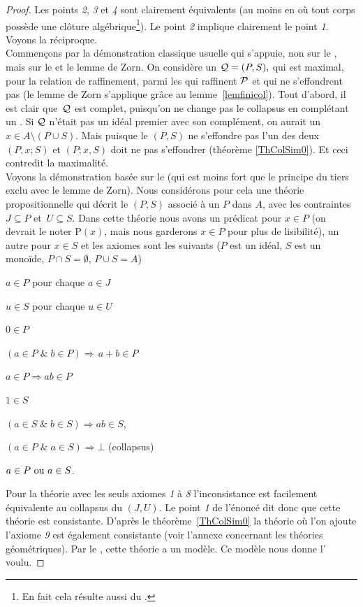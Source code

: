 \begin{proof} 
Les points \emph{2}, \emph{3} et \emph{4} sont clairement équivalents (au moins en \clama où tout corps possède une clôture algébrique\footnote{En fait cela résulte aussi du \tcg.}). Le point \emph{2} implique clairement le point \emph{1}. Voyons la réciproque.\\
Commençons par la démonstration classique usuelle qui s'appuie, non sur le \tcg, mais sur le 
\pte et le lemme de Zorn. On considère un \proi 
${\cal Q}=(P,S),$ qui est 
maximal, pour la relation de raffinement, parmi les \prois qui raffinent 
${\cal P}$ et qui ne s'effondrent pas (le lemme de Zorn s'applique grâce 
au lemme~\ref{lemfinicol}). Tout d'abord, il est clair que~${\cal Q}$ est 
complet, puisqu'on ne change pas le collapsus en complétant un \proi.
Si ${\cal Q}$ n'était pas un idéal premier avec son 
complément, on aurait un $x\in A\setminus (P\cup S)$. 
Mais puisque le \proi $(P,S)$ ne s'effondre pas l'un des deux
\prois $(P,{x};S)$ et $(P;{x},S)$ doit ne pas s'effondrer
(théorème \ref{ThColSim0}). Et ceci contredit la maximalité.\\
Voyons la démonstration basée sur le \tcg (qui est moins fort que le principe du tiers exclu avec le lemme de Zorn).
Nous considérons pour cela une théorie propositionnelle qui décrit le \proi   
$(P,S)$ associé à un \idep $P$ dans $A$, avec les contraintes $J\subseteq P$ \hbox{et $U\subseteq S$}.
Dans cette théorie nous avons un prédicat 
pour $x\in P$ (on devrait le noter $\mathrm{P}(x)$, mais nous garderons $x\in P$ pour plus de lisibilité), un autre pour $x\in S$
et les axiomes sont les suivants ($P$ est un idéal, $S$ est un monoïde, $P\cap S=\emptyset$, $P\cup S=A$)
\begin{enumerate}{\it 
\item $a\in P$  pour chaque $a\in J$
\item $u\in S$  pour chaque $u\in U$
\item $0\in P$
\item $(a\in P\;\&\; b\in P)\Rightarrow\, a+b\in P$
\item $a\in P\Rightarrow ab\in P$
\item $1\in S$
\item $(a\in S\;\&\; b\in S)\Rightarrow ab\in S$, 
\item $(a\in P\;\&\; a\in S)\Rightarrow \bot$  (collapsus) 
\item $a\in P \hbox{ ou } a\in S$.}
\end{enumerate}
Pour la théorie avec les seuls axiomes \emph{1} à \emph{8} l'inconsistance est facilement équivalente au collapsus du \proi $(J,U)$. 
Le point \emph{1} de l'énoncé dit donc que cette théorie est consistante.
D'après le théorème~\ref{ThColSim0} la théorie  où l'on ajoute l'axiome \emph{9} est également consistante (voir l'annexe concernant les théories géométriques).
Par le \tcg, cette théorie a un modèle. Ce modèle nous donne l'\idep 
voulu.
\end{proof}

